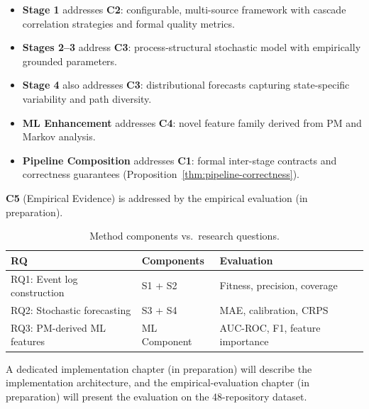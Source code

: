 \begin{itemize}
  \item \textbf{Stage 1} addresses \textbf{C2}: configurable, multi-source
  framework with cascade correlation strategies and formal quality metrics.
  \item \textbf{Stages 2--3} address \textbf{C3}: process-structural
  stochastic model with empirically grounded parameters.
  \item \textbf{Stage 4} also addresses \textbf{C3}: distributional
  forecasts capturing state-specific variability and path diversity.
  \item \textbf{ML Enhancement} addresses \textbf{C4}: novel feature
  family derived from PM and Markov analysis.
  \item \textbf{Pipeline Composition} addresses \textbf{C1}: formal
  inter-stage contracts and correctness guarantees
  (Proposition~\ref{thm:pipeline-correctness}).
\end{itemize}

\textbf{C5} (Empirical Evidence) is addressed by the empirical evaluation (in preparation).

\begin{table}[htbp]
\centering
\caption{Method components vs.\ research questions.}
\label{tab:method-rq-mapping}
\begin{tabular}{lll}
\toprule
\textbf{RQ} & \textbf{Components} & \textbf{Evaluation} \\
\midrule
RQ1: Event log construction       & S1 + S2          & Fitness, precision, coverage \\
RQ2: Stochastic forecasting       & S3 + S4          & MAE, calibration, CRPS \\
RQ3: PM-derived ML features       & ML Component     & AUC-ROC, F1, feature importance \\
\bottomrule
\end{tabular}
\end{table}

A dedicated implementation chapter (in preparation) will describe the
implementation architecture, and the empirical-evaluation chapter (in
preparation) will present the evaluation on the 48-repository dataset.
